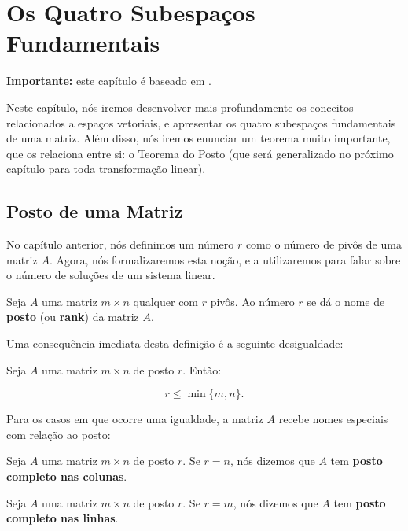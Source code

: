 \chapter{Os Quatro Subespaços Fundamentais}
\label{cap:subespacos-fundamentais}

\textbf{Importante:} este capítulo é baseado em \cite{slide4doyuri}.

Neste capítulo, nós iremos desenvolver mais profundamente os conceitos relacionados a espaços vetoriais, e apresentar os quatro subespaços fundamentais de uma matriz. Além disso, nós iremos enunciar um teorema muito importante, que os relaciona entre si: o Teorema do Posto (que será generalizado no próximo capítulo para toda transformação linear).

\section{Posto de uma Matriz}

No capítulo anterior, nós definimos um número $r$ como o número de pivôs de uma matriz $A$. Agora, nós formalizaremos esta noção, e a utilizaremos para falar sobre o número de soluções de um sistema linear.

\begin{Definition}[Posto]
	Seja $A$ uma matriz $m\times n$ qualquer com $r$ pivôs. Ao número $r$ se dá o nome de \textbf{posto} (ou \textbf{rank}) da matriz $A$.
\end{Definition}

Uma consequência imediata desta definição é a seguinte desigualdade:

\begin{Proposition}
	Seja $A$ uma matriz $m\times n$ de posto $r$. Então:
	
	$$
	r\leq\min\{m, n\}.
	$$
\end{Proposition}

Para os casos em que ocorre uma igualdade, a matriz $A$ recebe nomes especiais com relação ao posto:

\begin{Definition}
	Seja $A$ uma matriz $m\times n$ de posto $r$. Se $r = n$, nós dizemos que $A$ tem \textbf{posto completo nas colunas}.
\end{Definition}

\begin{Definition}
	Seja $A$ uma matriz $m\times n$ de posto $r$. Se $r = m$, nós dizemos que $A$ tem \textbf{posto completo nas linhas}.
\end{Definition}

